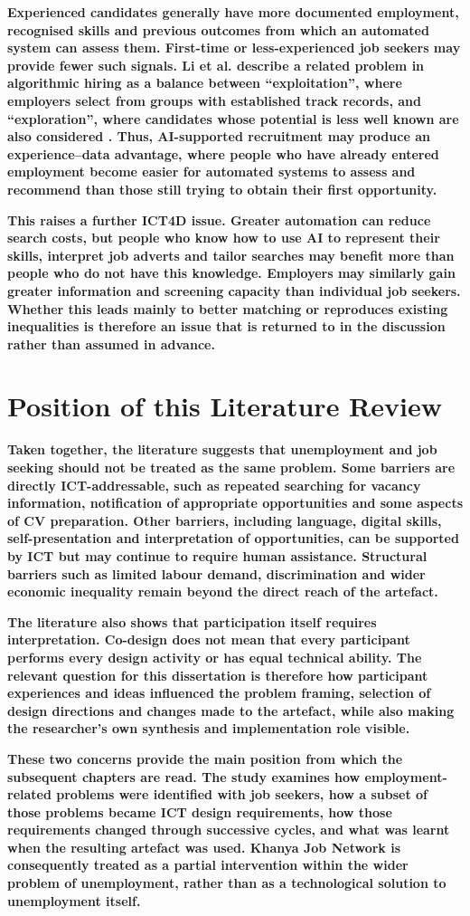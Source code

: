 \textbf{Experienced candidates generally have more documented employment, recognised skills and previous outcomes from which an automated system can assess them. First-time or less-experienced job seekers may provide fewer such signals. Li et al. describe a related problem in algorithmic hiring as a balance between “exploitation”, where employers select from groups with established track records, and “exploration”, where candidates whose potential is less well known are also considered \cite{li2026}. Thus, AI-supported recruitment may produce an experience–data advantage, where people who have already entered employment become easier for automated systems to assess and recommend than those still trying to obtain their first opportunity.}

\textbf{This raises a further ICT4D issue. Greater automation can reduce search costs, but people who know how to use AI to represent their skills, interpret job adverts and tailor searches may benefit more than people who do not have this knowledge. Employers may similarly gain greater information and screening capacity than individual job seekers. Whether this leads mainly to better matching or reproduces existing inequalities is therefore an issue that is returned to in the discussion rather than assumed in advance.}

\section{Position of this Literature Review}

\textbf{Taken together, the literature suggests that unemployment and job seeking should not be treated as the same problem. Some barriers are directly ICT-addressable, such as repeated searching for vacancy information, notification of appropriate opportunities and some aspects of CV preparation. Other barriers, including language, digital skills, self-presentation and interpretation of opportunities, can be supported by ICT but may continue to require human assistance. Structural barriers such as limited labour demand, discrimination and wider economic inequality remain beyond the direct reach of the artefact.}

\textbf{The literature also shows that participation itself requires interpretation. Co-design does not mean that every participant performs every design activity or has equal technical ability. The relevant question for this dissertation is therefore how participant experiences and ideas influenced the problem framing, selection of design directions and changes made to the artefact, while also making the researcher's own synthesis and implementation role visible.}

\textbf{These two concerns provide the main position from which the subsequent chapters are read. The study examines how employment-related problems were identified with job seekers, how a subset of those problems became ICT design requirements, how those requirements changed through successive cycles, and what was learnt when the resulting artefact was used. Khanya Job Network is consequently treated as a partial intervention within the wider problem of unemployment, rather than as a technological solution to unemployment itself.}